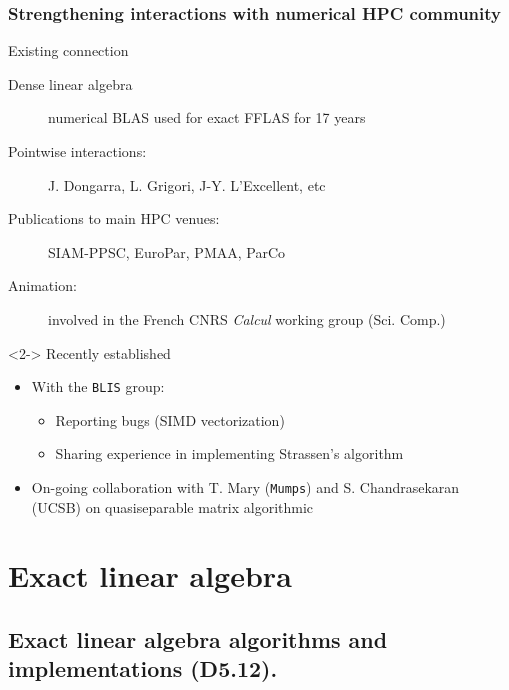 \documentclass{beamer}
\begin{document}
\begin{frame}
  \frametitle{Strengthening interactions with numerical HPC community}
  \begin{block}  {Existing connection}
    \begin{description}
    \item[Dense linear algebra] numerical BLAS used for exact FFLAS for 17 years
    \item[Pointwise interactions:] J. Dongarra, L. Grigori, J-Y. L'Excellent,  etc
    \item[Publications to main HPC venues:]
      SIAM-PPSC, EuroPar, PMAA, ParCo
    \item[Animation:] involved in the French CNRS \textit{Calcul}  working group (Sci. Comp.)
    \end{description}
  \end{block}
  \begin{block}<2->  {Recently established}
    \begin{itemize}
    \item With the \texttt{BLIS} group:
      \begin{itemize}
      \item Reporting bugs (SIMD vectorization)
      \item Sharing experience in implementing Strassen's algorithm
      \end{itemize}
    \item On-going collaboration with T. Mary (\texttt{Mumps}) and
        S. Chandrasekaran (UCSB) on quasiseparable matrix algorithmic
    \end{itemize}
  \end{block}
\end{frame}

\section{Exact linear algebra}
\subsection{Exact linear algebra algorithms and implementations (D5.12).}
\end{document}
